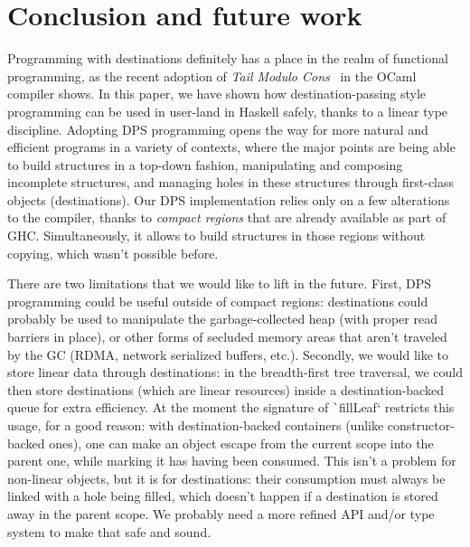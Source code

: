 \documentclass[english]{jflart}
\begin{document}
\section{Conclusion and future work}

Programming with destinations definitely has a place in the realm of functional programming, as the recent adoption of \emph{Tail Modulo Cons}~\cite{bour_tmc_2021} in the OCaml compiler shows. In this paper, we have shown how destination-passing style programming can be used in user-land in Haskell safely, thanks to a linear type discipline. Adopting DPS programming opens the way for more natural and efficient programs in a variety of contexts, where the major points are being able to build structures in a top-down fashion, manipulating and composing incomplete structures, and managing holes in these structures through first-class objects (destinations). Our DPS implementation relies only on a few alterations to the compiler, thanks to \emph{compact regions} that are already available as part of GHC. Simultaneously, it allows to build structures in those regions without copying, which wasn't possible before.

There are two limitations that we would like to lift in the future. First, DPS programming could be useful outside of compact regions: destinations could probably be used to manipulate the garbage-collected heap (with proper read barriers in place), or other forms of secluded memory areas that aren't traveled by the GC (RDMA, network serialized buffers, etc.). Secondly, we would like to store linear data through destinations: in the breadth-first tree traversal, we could then store destinations (which are linear resources) inside a destination-backed queue for extra efficiency. At the moment the signature of \texttt`fillLeaf` restricts this usage, for a good reason: with destination-backed containers (unlike constructor-backed ones), one can make an object escape from the current scope into the parent one, while marking it has having been consumed. This isn't a problem for non-linear objects, but it is for destinations: their consumption must always be linked with a hole being filled, which doesn't happen if a destination is stored away in the parent scope. We probably need a more refined API and/or type system to make that safe and sound.
\clearpage{}
{}

\end{document}
